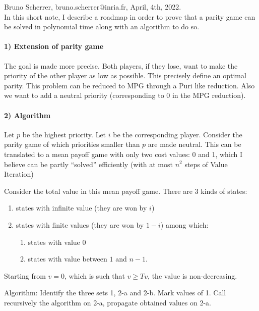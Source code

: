 \documentclass{article}
\begin{document}
Bruno Scherrer, bruno.scherrer@inria.fr, April, 4th, 2022.
~\\

In this short note, I describe a roadmap in order to prove that a parity game can be solved in polynomial time along with an algorithm to do so.


\paragraph{1) Extension of parity game}

The goal is made more precise. Both players, if they lose, want to make the priority of the other player as low as possible. 
This precisely define an optimal parity. This problem can be reduced to MPG through a Puri like reduction.
Also we want to add a neutral priority (corresponding to 0 in the MPG reduction).

\paragraph{2) Algorithm}

Let $p$ be the highest priority. Let $i$ be the corresponding player. Consider the parity game of which priorities smaller than $p$ are made neutral.
This can be translated to a mean payoff game with only two cost values: 0 and 1, which I believe can be partly ``solved'' efficiently (with at most $n^2$ steps of Value Iteration)

Consider the total value in this mean payoff game. There are 3 kinds of states:
\begin{enumerate}
  \item  states with infinite value (they are won by $i$)
\item  states with finite values (they are won by $1-i$) among which:
  \begin{enumerate}
  \item states with value $0$
  \item states with value between $1$ and $n-1$.
  \end{enumerate}
\end{enumerate}
Starting from $v=0$, which is such that $v \ge Tv$, the value is non-decreasing.


Algorithm: Identify the three sets 1, 2-a and 2-b. Mark values of 1. Call recursively the algorithm on 2-a, propagate obtained values on 2-a. 
\end{document}
